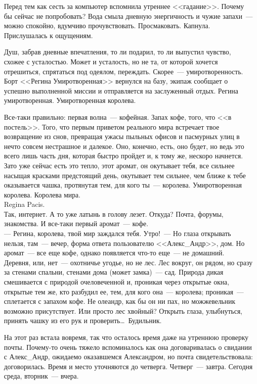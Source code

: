 Перед тем как сесть за компьютер вспомнила утреннее <<гадание>>. Почему бы сейчас 
не попробовать? Вода смыла дневную энергичность и чужие запахи~--- можно 
спокойно, 
вдумчиво прочувствовать. Просмаковать. Капнула. Прислушалась к ощущениям.

Душ, забрав дневные впечатления, то ли подарил, то ли выпустил чувство, схожее с 
усталостью. Может и усталость, но не та, от которой хочется отрешиться, 
спрятаться под одеялом, переждать. Скорее~--- умиротворенность. Борт <<Регина 
Умиротворенная>> вернулся на базу, экипаж сообщает о успешно выполненной миссии и 
отправляется на заслуженный отдых. Регина умиротворенная. Умиротворенная 
королева.

Все-таки правильно: первая волна~--- кофейная. Запах кофе, того, что <<в 
постель>>. 
Того, что первым приветом реального мира встречает твое возвращение из снов, 
превращая ужасы пыльных офисов и пасмурных улиц в нечто совсем нестрашное и 
далекое. Оно, конечно, есть, оно будет, но ведь это всего лишь часть дня, 
которая быстро пройдет и, к тому же, нескоро начнется. Зато уже сейчас есть это 
тепло, этот аромат, он окутывает тебя, все сильнее насыщая красками предстоящий 
день, окутывает тем сильнее, чем ближе к тебе оказывается чашка, протянутая тем, 
для кого ты~--- королева. Умиротворенная королева. Королева мира.\\

Regina Pacis.\\

Так, интернет. А то уже латынь в голову лезет. Откуда? Почта, форумы, 
знакомства. И все-таки первый аромат~--- кофе.\\

\noindent --- Регина, королева, твой мир заждался тебя. Утро!~--- Но глаза 
открывать нельзя, 
там~--- вечер, форма ответа пользователю <<Алекс\_Андр>>, дом. Но аромат~--- 
все еще 
кофе, однако появляется что-то еще~--- не домашний. Деревня, или, нет~--- 
охотничье 
угодье, но не лес. Лес вокруг, он рядом, но сразу за стенами спальни, стенами 
дома (может замка)~--- сад. Природа дикая смешивается с природой очеловеченной 
и, 
проникая через открытые окна, открытые тем же, кто разбудил ее, тем, для кого 
она~--- королева; проникая~--- сплетается с запахом кофе. Не олеандр, как бы он 
ни 
пах, но можжевельник возможно присутствует. Или просто лес хвойный? Открыть 
глаза, улыбнуться, принять чашку из его рук и проверить\ldots\ Будильник.

На этот раз встала вовремя, так что осталось время даже на утреннюю проверку 
почты. Почему-то очень тяжело вспоминалось как она договаривалась о свидании с 
Алекс\_Андр, ожидаемо оказавшемся Александром, но почта свидетельствовала: 
договорилась. Время и место уточняются до четверга. Четверг~--- завтра. Сегодня 
среда, вторник~--- вчера.

